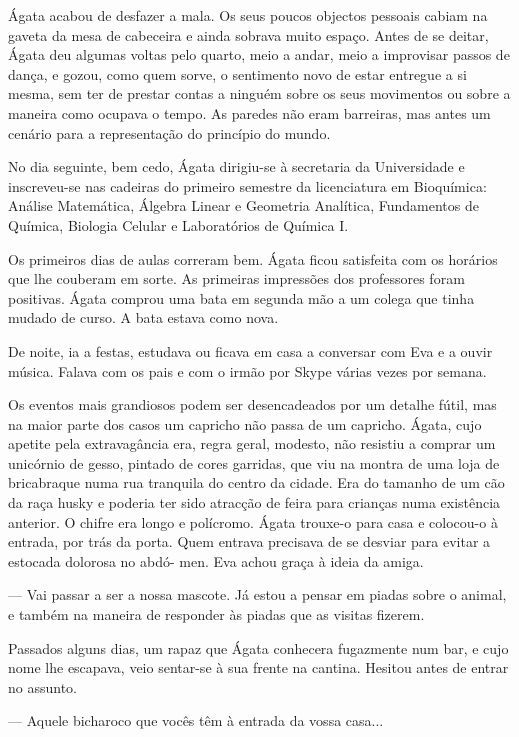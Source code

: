 Ágata acabou de desfazer a mala. Os seus poucos objectos pessoais
cabiam na gaveta da mesa de cabeceira e ainda sobrava muito espaço.
Antes de se deitar, Ágata deu algumas voltas pelo quarto, meio a andar,
meio a improvisar passos de dança, e gozou, como quem sorve, o
sentimento novo de estar entregue a si mesma, sem ter de prestar contas
a ninguém sobre os seus movimentos ou sobre a maneira como ocupava o
tempo. As paredes não eram barreiras, mas antes um cenário para a
representação do princípio do mundo.


No dia seguinte, bem cedo, Ágata dirigiu-se à secretaria da Universidade
e inscreveu-se nas cadeiras do primeiro semestre da licenciatura em
Bioquímica: Análise Matemática, Álgebra Linear e Geometria Analítica,
Fundamentos de Química, Biologia Celular e Laboratórios de Química I.

Os primeiros dias de aulas correram bem. Ágata ficou satisfeita com os
horários que lhe couberam em sorte. As primeiras impressões dos
professores foram positivas. Ágata comprou uma bata em segunda mão a um
colega que tinha mudado de curso. A bata estava como nova.

De noite, ia a festas, estudava ou ficava em casa a conversar com Eva
e a ouvir música. Falava com os pais e com o irmão por Skype várias
vezes por semana.

Os eventos mais grandiosos podem ser desencadeados por um detalhe fútil,
mas na maior parte dos casos um capricho não passa de um capricho.
Ágata, cujo apetite pela extravagância era, regra geral, modesto, não
resistiu a comprar um unicórnio de gesso, pintado de cores garridas, que
viu na montra de uma loja de bricabraque numa rua tranquila do centro
da cidade. Era do tamanho de um cão da raça husky e poderia ter sido
atracção de feira para crianças numa existência anterior. O chifre era
longo e polícromo. Ágata trouxe-o para casa e colocou-o à entrada, por
trás da porta. Quem entrava precisava de se desviar para evitar a
estocada dolorosa no abdó- men. Eva achou graça à ideia da amiga.

--- Vai passar a ser a nossa mascote. Já estou a pensar em piadas sobre o
  animal, e também na maneira de responder às piadas que as visitas
  fizerem.

Passados alguns dias, um rapaz que Ágata conhecera fugazmente num bar,
e cujo nome lhe escapava, veio sentar-se à sua frente na cantina.
Hesitou antes de entrar no assunto.

--- Aquele bicharoco que vocês têm à entrada da vossa casa...

